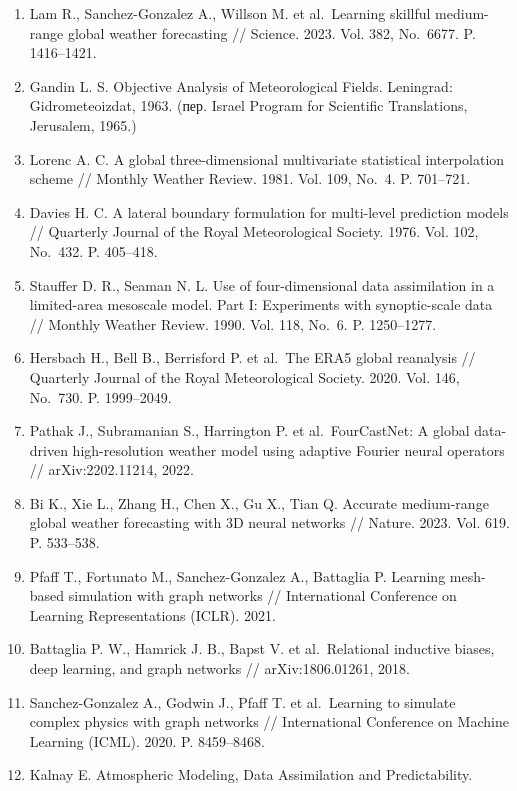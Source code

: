 \documentclass[14pt,a4paper]{extarticle}
\numberwithin{table}{section}
\numberwithin{figure}{section}
\numberwithin{equation}{section}
\begin{document}
\begin{enumerate}
\def\labelenumi{\arabic{enumi}.}
\item
  Lam R., Sanchez-Gonzalez A., Willson M. et al.~Learning skillful
  medium-range global weather forecasting // Science. 2023. Vol. 382,
  No.~6677. P. 1416--1421.
\item
  Gandin L. S. Objective Analysis of Meteorological Fields. Leningrad:
  Gidrometeoizdat, 1963. (пер. Israel Program for Scientific
  Translations, Jerusalem, 1965.)
\item
  Lorenc A. C. A global three-dimensional multivariate statistical
  interpolation scheme // Monthly Weather Review. 1981. Vol. 109, No.~4.
  P. 701--721.
\item
  Davies H. C. A lateral boundary formulation for multi-level prediction
  models // Quarterly Journal of the Royal Meteorological Society. 1976.
  Vol. 102, No.~432. P. 405--418.
\item
  Stauffer D. R., Seaman N. L. Use of four-dimensional data assimilation
  in a limited-area mesoscale model. Part I: Experiments with
  synoptic-scale data // Monthly Weather Review. 1990. Vol. 118, No.~6.
  P. 1250--1277.
\item
  Hersbach H., Bell B., Berrisford P. et al.~The ERA5 global reanalysis
  // Quarterly Journal of the Royal Meteorological Society. 2020. Vol.
  146, No.~730. P. 1999--2049.
\item
  Pathak J., Subramanian S., Harrington P. et al.~FourCastNet: A global
  data-driven high-resolution weather model using adaptive Fourier
  neural operators // arXiv:2202.11214, 2022.
\item
  Bi K., Xie L., Zhang H., Chen X., Gu X., Tian Q. Accurate medium-range
  global weather forecasting with 3D neural networks // Nature. 2023.
  Vol. 619. P. 533--538.
\item
  Pfaff T., Fortunato M., Sanchez-Gonzalez A., Battaglia P. Learning
  mesh-based simulation with graph networks // International Conference
  on Learning Representations (ICLR). 2021.
\item
  Battaglia P. W., Hamrick J. B., Bapst V. et al.~Relational inductive
  biases, deep learning, and graph networks // arXiv:1806.01261, 2018.
\item
  Sanchez-Gonzalez A., Godwin J., Pfaff T. et al.~Learning to simulate
  complex physics with graph networks // International Conference on
  Machine Learning (ICML). 2020. P. 8459--8468.
\item
  Kalnay E. Atmospheric Modeling, Data Assimilation and Predictability.

\end{enumerate}
\end{document}
